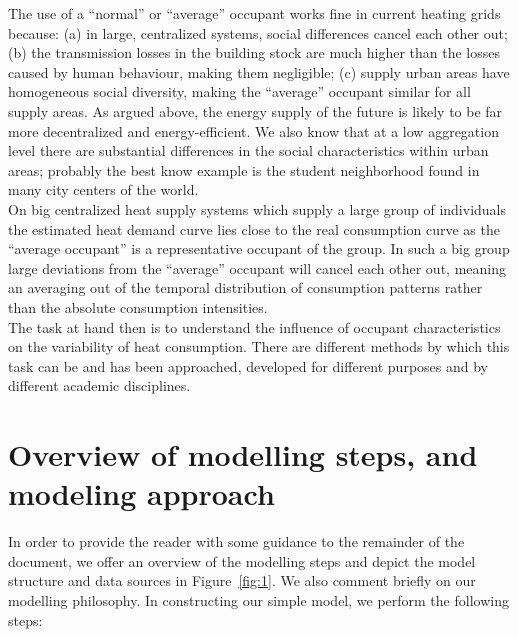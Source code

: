 \documentclass[11pt]{IJM-article}
\begin{document}
The use of a ``normal'' or ``average'' occupant works fine in current heating
grids because: (a) in large, centralized systems, social differences cancel
each other out; (b) the transmission losses in the building stock are much
higher than the losses caused by human behaviour, making them negligible; (c)
supply urban areas have homogeneous social diversity, making the ``average''
occupant similar for all supply areas. As argued above, the energy supply of
the future is likely to be far more decentralized  and
energy-efficient.  We also know that at a low aggregation level there are
substantial differences in the social characteristics within urban areas;
probably the best know example is the student neighborhood found in many city
centers of the world.\\

On big centralized heat supply systems which supply a large group of
individuals the estimated heat demand curve lies close to the real consumption
curve as the ``average occupant'' is a representative occupant of the group. In
such a big group large deviations from the ``average'' occupant will cancel
each other out, meaning an averaging out of the temporal distribution of
consumption patterns rather than the absolute consumption intensities.\\

The task at hand then is to understand the influence of occupant
characteristics on the variability of heat consumption. There are different
methods by which this task can be and has been approached, developed for
different purposes and by different academic disciplines.

\section{Overview of modelling steps, and modeling approach}\label{sec:2}

In order to provide the reader with some guidance to the remainder of the
document, we offer an overview of the modelling steps and depict the model
structure and data sources in Figure~\ref{fig:1}.  We also comment briefly on
our modelling philosophy. In constructing our simple model, we perform the
following steps:\\
\end{document}
